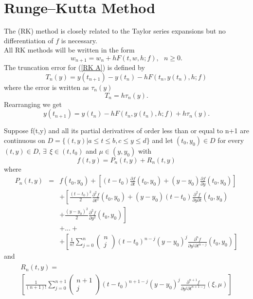 \chapter{Runge--Kutta Method}
The  (RK) method is closely related to the Taylor series expansions but no differentiation of $f$ is necessary.\\
All RK methods will be written in the form
\begin{equation}
\label{RK A}
w_{n+1} =w_n +hF(t,w,h;f), \ \ \ n\geq 0.
\end{equation}
The truncation error for (\ref{RK A}) is defined by
\[
T_{n}(y) =y(t_{n+1})-y(t_n) -hF(t_n,y(t_n),h;f) 
\]
where the error is written as $\tau_n(y)$ 
\[ T_n=h\tau_n(y).\]
Rearranging we get
\[
y(t_{n+1})=y(t_n) -h F(t_n,y(t_n),h;f) +
h\tau_n(y).\]


\begin{theorem} \label{RK_Theorem}
Suppose f(t,y) and all its partial derivatives of order less than or equal to
n+1 are continuous on $D=\{(t,y)|a\leq t \leq b, c \leq y \leq d \}$ and let 
$(t_0,y_0)\in D$ for every $(t,y)\in D$, $\exists \ \ \xi \in (t,t_0)$ and $\mu \in (y,y_0)$ with
\[f(t,y) = P_n(t,y) + R_n(t,y) \]
where
\begin{eqnarray*}
 P_n(t,y) &=& f(t_0,y_0)+\left[(t-t_0)\frac{\partial f}{\partial t}(t_0,y_0)+(y-y_0)\frac{\partial f}{\partial y}(t_0,y_0) \right]\\
& & + \left[\frac{(t-t_0)^2}{2}\frac{\partial^2 f}{\partial t^2}(t_0,y_0)+(y-y_0)(t-t_0)\frac{\partial^2 f}{\partial y\partial t}(t_0,y_0)\right. \\
& & +\left. \frac{(y-y_0)^2}{2}\frac{\partial^2 f}{\partial y^2}(t_0,y_0) \right]\\
& & +...+\\
& & + \left[\frac{1}{n!}\sum_{j=0}^n\left(\begin{array}{c}n \\ j \end{array}\right)(t-t_0)^{n-j}(y-y_0)^j\frac{\partial^n f}{\partial y^j\partial t^{n-j}}(t_0,y_0)  \right]
\end{eqnarray*}
and
\begin{eqnarray*}\begin{aligned}R_n(t,y) = \\\left[\frac{1}{(n+1)!}\sum_{j=0}^{n+1}\left(\begin{array}{c}n+1 \\ j \end{array}\right)(t-t_0)^{n+1-j}(y-y_0)^j\frac{\partial^{n+1} f}{\partial y^j\partial t^{n+1-j}}(\xi,\mu)  \right]\end{aligned}
\end{eqnarray*}
\end{theorem}
